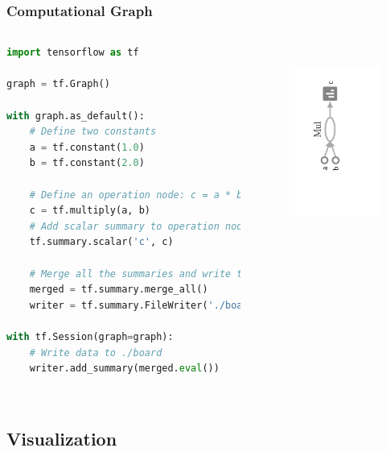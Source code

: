 \begin{frame}[fragile]
  \MyLogo
  \frametitle{Computational Graph}  
%  
\begin{columns}
\tiny{
\begin{lstlisting}[language=python]
import tensorflow as tf

graph = tf.Graph()

with graph.as_default():
	# Define two constants
	a = tf.constant(1.0)
	b = tf.constant(2.0)

	# Define an operation node: c = a * b
	c = tf.multiply(a, b)
	# Add scalar summary to operation node
	tf.summary.scalar('c', c)
	
	# Merge all the summaries and write to ./board
	merged = tf.summary.merge_all()
	writer = tf.summary.FileWriter('./board', graph)

with tf.Session(graph=graph):
	# Write data to ./board
	writer.add_summary(merged.eval())
	
\end{lstlisting}
}
%
\begin{figure}[htbp] 
   \includegraphics[height=2.5in]{figures/compgraph.png} 
\end{figure}
%
\end{columns}
\end{frame}

\subsection{Visualization}

